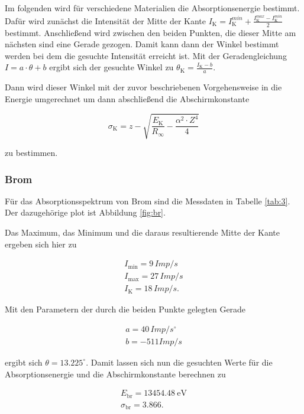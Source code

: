 Im folgenden wird für verschiedene Materialien die Absorptionsenergie bestimmt. Dafür wird zunächst die Intensität der Mitte der Kante $I_\text{K} = I_\text{K}^{min} + \frac{I_\text{K}^{max}-I_\text{K}^{min}}{2}$ bestimmt. Anschließend wird zwischen den beiden Punkten, die dieser Mitte am nächsten sind eine Gerade gezogen. Damit kann dann der Winkel bestimmt werden bei dem die gesuchte Intensität erreicht ist. Mit der Geradengleichung $I = a \cdot \theta + b$ ergibt sich der gesuchte Winkel zu $\theta_\text{K} = \frac{I_\text{K}-b}{a}$.

Dann wird dieser Winkel mit der zuvor beschriebenen Vorgehensweise in die Energie umgerechnet um dann abschließend die Abschirmkonstante 

\begin{equation*}
    \sigma_\text{K} = z-\sqrt{\frac{E_\text{K}}{R_\infty}-\frac{\alpha^2\cdot Z^4}{4}}
\end{equation*}

zu bestimmen.

\subsubsection{Brom}

Für das Absorptionsspektrum von Brom sind die Messdaten in Tabelle \ref{tab:3}. Der dazugehörige plot ist Abbildung \ref{fig:br}.

Das Maximum, das Minimum und die daraus resultierende Mitte der Kante ergeben sich hier zu 

\begin{align*}
    I_\text{min} = 9 \, Imp/s \\
    I_\text{max} = 27 \, Imp/s \\
    I_\text{K} = 18 \, Imp/s.
\end{align*}

Mit den Parametern der durch die beiden Punkte gelegten Gerade

\begin{align*}
    a = 40 \, Imp/s^\circ \\
    b = -511 Imp/s
\end{align*}

ergibt sich $\theta = 13.225  ^\circ$. Damit lassen sich nun die gesuchten Werte für die Absorptionsenergie und die Abschirmkonstante berechnen zu 

\begin{align*}
    E_\text{br} = \SI{13454.48}{\electronvolt}\\
    \sigma_\text{br} = 3.866.
\end{align*}


